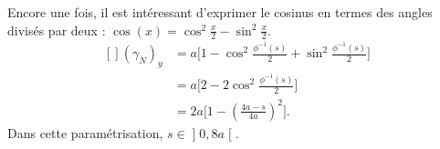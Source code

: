 \begin{example}
    Encore une fois, il est intéressant d'exprimer le cosinus en termes des angles divisés par deux : $\cos(x)=\cos^2\frac{ x }{2}-\sin^2\frac{ x }{2}$.
    \begin{equation}
        \begin{aligned}[]
            (\gamma_N)_y&=a\Big[ 1-\cos^2\frac{ \phi^{-1}(s) }{2}+\sin^2\frac{ \phi^{-1}(s) }{2} \Big]\\
            &=a\Big[ 2-2\cos^2\frac{ \phi^{-1}(s) }{2} \Big]\\
            &=2a\Big[ 1-\left( \frac{ 4a-s }{ 4a } \right)^2 \Big].
        \end{aligned}
    \end{equation}
    Dans cette paramétrisation, $s\in\mathopen] 0 , 8a \mathclose[$.
\end{example}

